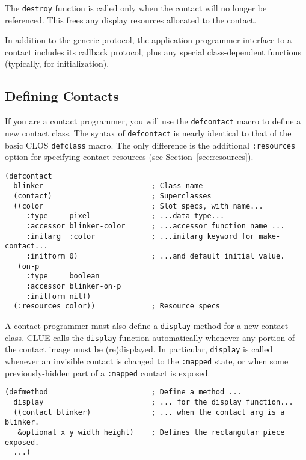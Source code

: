 The {\tt destroy} function is called 
only when the contact will no longer be referenced. This frees any display
resources allocated to the contact.

In addition to the generic protocol, the application programmer interface to a
contact includes its callback protocol, plus any special class-dependent functions (typically, for
initialization).

\subsection{Defining Contacts}

If you are a contact programmer, you will use the {\tt defcontact} macro to
define a new contact class.  The syntax of {\tt defcontact} is nearly identical
to that of the basic CLOS {\tt defclass} macro.  The only difference is the
additional {\tt :resources} option for specifying contact resources (see
Section~\ref{sec:resources}).

\begin{verbatim}
(defcontact
  blinker                         ; Class name  
  (contact)                       ; Superclasses  
  ((color                         ; Slot specs, with name...
     :type     pixel              ; ...data type...
     :accessor blinker-color      ; ...accessor function name ...
     :initarg  :color             ; ...initarg keyword for make-contact...
     :initform 0)                 ; ...and default initial value.
   (on-p
     :type     boolean
     :accessor blinker-on-p
     :initform nil))  
  (:resources color))             ; Resource specs
\end{verbatim}

A contact programmer must also define a {\tt display} method for a new contact
class. CLUE calls the {\tt display} function automatically whenever any portion
of the contact image must be (re)displayed. In particular, {\tt display} is
called whenever an invisible contact is changed to the {\tt :mapped} state, or
when some previously-hidden part of a {\tt :mapped} contact is exposed.

\begin{verbatim}
(defmethod                        ; Define a method ...
  display                         ; ... for the display function...
  ((contact blinker)              ; ... when the contact arg is a blinker.
   &optional x y width height)    ; Defines the rectangular piece exposed.
  ...)
\end{verbatim}

